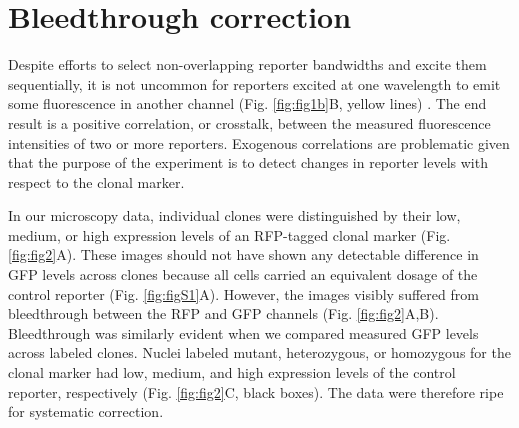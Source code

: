 \section{Bleedthrough correction}
\label{ch:correction}

Despite efforts to select non-overlapping reporter bandwidths and excite them sequentially, it is not uncommon for reporters excited at one wavelength to emit some fluorescence in another channel (Fig. \ref{fig:fig1b}B, yellow lines) \cite{Bacia2012,Zinchuk2007}. The end result is a positive correlation, or crosstalk, between the measured fluorescence intensities of two or more reporters. Exogenous correlations are problematic given that the purpose of the experiment is to detect changes in reporter levels with respect to the clonal marker.

In our microscopy data, individual clones were distinguished by their low, medium, or high expression levels of an RFP-tagged clonal marker (Fig. \ref{fig:fig2}A). These images should not have shown any detectable difference in GFP levels across clones because all cells carried an equivalent dosage of the control reporter (Fig. \ref{fig:figS1}A). However, the images visibly suffered from bleedthrough between the RFP and GFP channels (Fig. \ref{fig:fig2}A,B). Bleedthrough was similarly evident when we compared measured GFP levels across labeled clones. Nuclei labeled mutant, heterozygous, or homozygous for the clonal marker had low, medium, and high expression levels of the control reporter, respectively (Fig. \ref{fig:fig2}C, black boxes). The data were therefore ripe for systematic correction.

